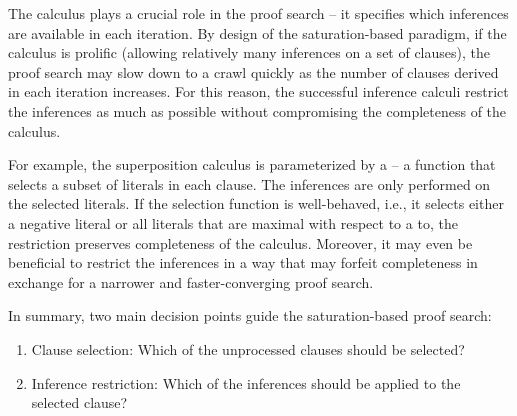 The calculus plays a crucial role in the proof search -- it specifies which inferences are available in each iteration.
By design of the saturation-based paradigm, if the calculus is prolific (allowing relatively many inferences on a set of clauses), the proof search may slow down to a crawl quickly as the number of clauses derived in each iteration increases.
For this reason, the successful inference calculi restrict the inferences as much as possible without compromising the completeness of the calculus.

For example, the superposition calculus \cite{DBLP:journals/logcom/BachmairG94}
is parameterized by a  -- a function that selects a subset of literals in each clause.
The inferences are only performed on the selected literals.
If the selection function is well-behaved,
i.e., it selects either a negative literal or all literals that are maximal with respect to a \gls{to},
the restriction preserves completeness of the calculus.
Moreover, it may even be beneficial to restrict the inferences in a way that may forfeit completeness
in exchange for a narrower and faster-converging proof search.



In summary, two main decision points guide the \gls{saturation}-based proof search:
\begin{enumerate}
\item Clause selection: Which of the unprocessed clauses should be selected?
\item Inference restriction: Which of the inferences should be applied to the selected clause?
\end{enumerate}

